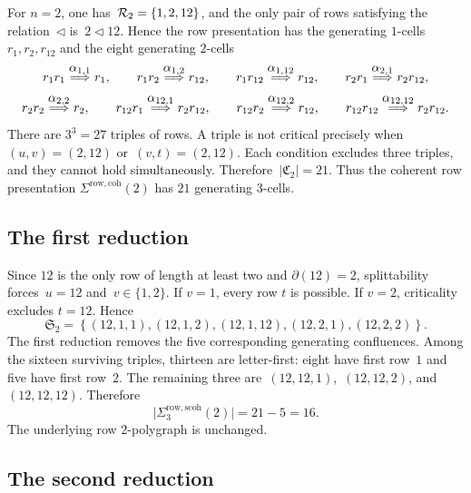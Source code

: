 \documentclass[a4paper, twoside, 11pt, english]{article}
\begin{document}
For $n=2$, one has~$\mathcal{R}_2=\{1,2,12\}$,
and the only pair of rows satisfying the relation~$\triangleleft$ is~$2\triangleleft12$.
Hence the row presentation has the generating $1$-cells
$r_1,r_2,r_{12}$ and the eight generating $2$-cells
\[
r_1r_1\overset{\displaystyle \alpha_{1,1}}{\Longrightarrow}r_1,
\qquad
r_1r_2\overset{\displaystyle \alpha_{1,2}}{\Longrightarrow}r_{12},
\qquad
r_1r_{12}\overset{\displaystyle \alpha_{1,12}}{\Longrightarrow}r_{12},
\qquad
r_2r_1\overset{\displaystyle \alpha_{2,1}}{\Longrightarrow}r_2r_{12},
\]
\[
r_2r_2\overset{\displaystyle \alpha_{2,2}}{\Longrightarrow}r_2,
\qquad
r_{12}r_1\overset{\displaystyle \alpha_{12,1}}{\Longrightarrow}r_2r_{12},
\qquad
r_{12}r_2\overset{\displaystyle \alpha_{12,2}}{\Longrightarrow}r_{12},
\qquad
r_{12}r_{12}\overset{\displaystyle \alpha_{12,12}}{\Longrightarrow}r_2r_{12}.
\]
There are $3^3=27$ triples of rows. A triple is not critical precisely
when~$
(u,v)=(2,12)$ or~$(v,t)=(2,12)$.
Each condition excludes three triples, and they cannot hold
simultaneously. Therefore~$|\mathfrak C_2|=21$.
Thus the coherent row presentation
$\Sigma^{\mathrm{row,coh}}(2)$ has $21$ generating $3$-cells.

\subsection{The first reduction}

Since $12$ is the only row of length at least two and
$\partial(12)=2$, splittability forces~$
u=12$ and~$v\in\{1,2\}$.
If $v=1$, every row $t$ is possible. If $v=2$, criticality excludes
$t=12$. Hence
\[
\mathfrak S_2
=
\left\{
(12,1,1),
(12,1,2),
(12,1,12),
(12,2,1),
(12,2,2)
\right\}.
\]
The first reduction removes the five corresponding generating
confluences. Among the sixteen surviving triples, thirteen are
letter-first: eight have first row~$1$ and five have first row~$2$.
The remaining three are~$(12,12,1)$,~$(12,12,2)$, and~$(12,12,12)$.
Therefore
\[
\bigl|\Sigma^{\mathrm{row,scoh}}_3(2)\bigr|
=
21-5
=
16.
\]
The underlying row $2$-polygraph is unchanged.

\subsection{The second reduction}
\end{document}
